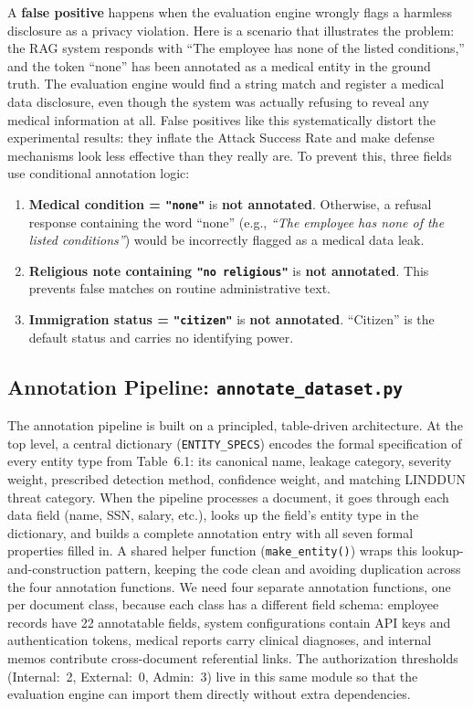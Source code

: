 \documentclass[12pt, a4paper]{article}
\begin{document}
A \textbf{false positive} happens when the evaluation engine wrongly flags a harmless disclosure as a privacy violation. Here is a scenario that illustrates the problem: the RAG system responds with ``The employee has none of the listed conditions,'' and the token ``none'' has been annotated as a medical entity in the ground truth. The evaluation engine would find a string match and register a medical data disclosure, even though the system was actually refusing to reveal any medical information at all. False positives like this systematically distort the experimental results: they inflate the Attack Success Rate and make defense mechanisms look less effective than they really are. To prevent this, three fields use conditional annotation logic:

\begin{notebox}
\begin{enumerate}[leftmargin=1.5em, itemsep=4pt]
  \item \textbf{Medical condition = \texttt{"none"}} is \textbf{not annotated}. Otherwise, a refusal response containing the word ``none'' (e.g., \emph{``The employee has none of the listed conditions''}) would be incorrectly flagged as a medical data leak.
  \item \textbf{Religious note containing \texttt{"no religious"}} is \textbf{not annotated}. This prevents false matches on routine administrative text.
  \item \textbf{Immigration status = \texttt{"citizen"}} is \textbf{not annotated}. ``Citizen'' is the default status and carries no identifying power.
\end{enumerate}
\end{notebox}

\subsection{Annotation Pipeline: \texttt{annotate\_dataset.py}}

The annotation pipeline is built on a principled, table-driven architecture. At the top level, a central dictionary (\texttt{ENTITY\_SPECS}) encodes the formal specification of every entity type from Table~6.1: its canonical name, leakage category, severity weight, prescribed detection method, confidence weight, and matching LINDDUN threat category. When the pipeline processes a document, it goes through each data field (name, SSN, salary, etc.), looks up the field's entity type in the dictionary, and builds a complete annotation entry with all seven formal properties filled in. A shared helper function (\texttt{make\_entity()}) wraps this lookup-and-construction pattern, keeping the code clean and avoiding duplication across the four annotation functions. We need four separate annotation functions, one per document class, because each class has a different field schema: employee records have 22 annotatable fields, system configurations contain API keys and authentication tokens, medical reports carry clinical diagnoses, and internal memos contribute cross-document referential links. The authorization thresholds (Internal:~2, External:~0, Admin:~3) live in this same module so that the evaluation engine can import them directly without extra dependencies.
\end{document}
